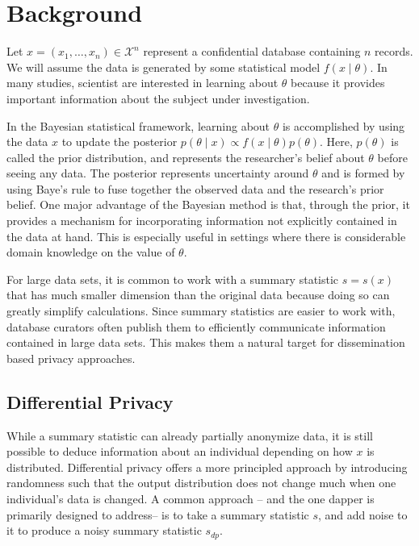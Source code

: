 \hypertarget{background}{%
\section{Background}\label{background}}

Let \(x = (x_1, \ldots, x_n) \in \mathcal{X}^n\) represent a confidential
database containing \(n\) records. We will assume the
data is generated by some statistical model \(f( x \mid \theta)\). In many studies,
scientist are interested in learning about \(\theta\) because it provides important information about the subject under investigation.

In the Bayesian statistical framework, learning about \(\theta\) is
accomplished by using the data \(x\) to update the
posterior \(p(\theta \mid x) \propto f(x \mid \theta) p(\theta)\).
Here, \(p(\theta)\) is called the prior distribution, and represents
the researcher's belief about \(\theta\) before seeing any data. The
posterior represents uncertainty around \(\theta\) and is formed by using Baye's rule to fuse together the
observed data and the research's prior belief.
One major advantage of the Bayesian method is that, through the prior,
it provides a mechanism for incorporating information not explicitly contained
in the data at hand. This is especially useful in settings where there
is considerable domain knowledge on the value of \(\theta\).

For large data sets, it is common to work with a summary statistic \(s = s(x)\)
that has much smaller dimension than the original data because doing so can
greatly simplify calculations. Since summary statistics are easier to work with,
database curators often publish them to efficiently communicate information
contained in large data sets.
This makes them a natural target for
dissemination based privacy approaches.

\hypertarget{differential-privacy}{%
\subsection{Differential Privacy}\label{differential-privacy}}

While a summary statistic can already partially anonymize data, it is still
possible to deduce information about an individual depending on how \(x\) is distributed.
Differential privacy offers a more principled
approach by introducing randomness such that the output distribution
does not change much when one individual's data is changed. A common approach -- and the one dapper
is primarily designed to address--
is to take a summary statistic \(s\), and add noise to it
to produce a noisy summary statistic \(s_{dp}\).

